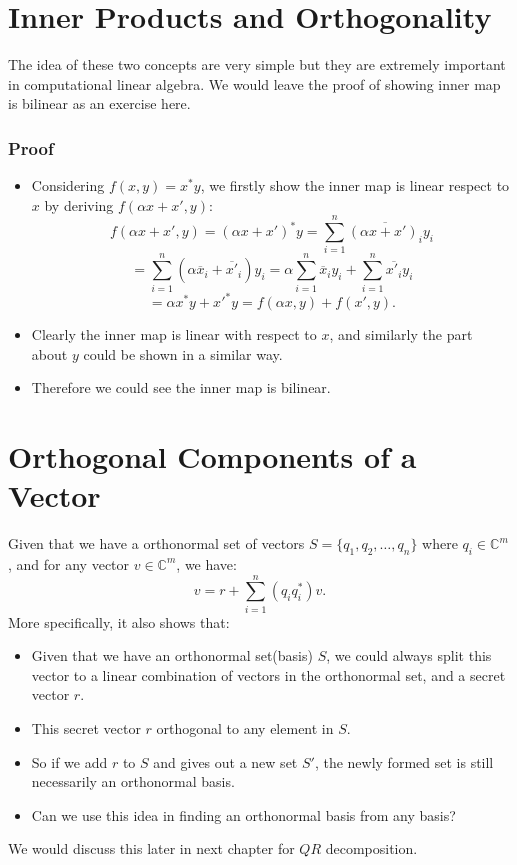 \section{Inner Products and Orthogonality}%
The idea of these two concepts are very simple but they are extremely important in computational linear algebra. We would leave the proof of showing inner map is bilinear as an exercise here.

\subsubsection*{Proof}%
\begin{itemize}
  \item Considering $f(x, y) = x^{*}y$, we firstly show the inner map is linear respect to $x$ by deriving $f(\alpha x + x', y)$:
    \[
    f(\alpha x + x', y) = (\alpha x + x')^{*}y = \sum_{i=1}^{n} \overline{(\alpha x + x')_i}y_i
    \]
    \[
      = \sum_{i=1}^{n} (\alpha \overline{x}_i + \overline{x'}_i)y_i = \alpha \sum_{i=1}^{n} \overline{x}_{i} y_i + \sum_{i=1}^{n} \overline{x'_i} y_i
    \]
    \[
      = \alpha x^{*}y + x'^{*}y = f(\alpha x, y) + f(x', y)
    .\] 
  \item Clearly the inner map is linear with respect to  $x$, and similarly the part about $y$ could be shown in a similar way.
  \item Therefore we could see the inner map is bilinear.
\end{itemize}
\newpage
\section{Orthogonal Components of a Vector}%
Given that we have a orthonormal set of vectors $S = \{q_1, q_2, \ldots, q_n\} $ where $q_i \in \mathbb{C}^{m}$, and for any vector $v \in \mathbb{C}^{m}$, we have:
\[
  v = r + \sum_{i=1}^{n} (q_iq_i^{*})v
.\] 
More specifically, it also shows that:
\begin{itemize}
  \item Given that we have an orthonormal set(basis) $S$, we could always split this vector to a linear combination of vectors in the orthonormal set, and a secret vector $r$. 
  \item This secret vector $r$ orthogonal to any element in $S$.
  \item So if we add $r$ to $S$ and gives out a new set $S'$, the newly formed set is still necessarily an orthonormal basis.
  \item Can we use this idea in finding an orthonormal basis from any basis?
\end{itemize}
We would discuss this later in next chapter for $QR$ decomposition.
